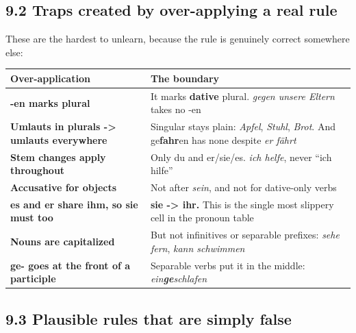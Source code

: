 \documentclass[
  11pt,
]{article}
\newcounter{none} %
\begin{document}
\subsection{9.2 Traps created by over-applying a real
rule}\label{traps-created-by-over-applying-a-real-rule}

These are the hardest to unlearn, because the rule is genuinely correct
somewhere else:

{\def\LTcaptype{none} %
\begin{longtable}[]{@{}
  >{\raggedright\arraybackslash}p{}
  >{\raggedright\arraybackslash}p{}@{}}
\toprule\noalign{}
\begin{minipage}[b]{\linewidth}\raggedright
Over-application
\end{minipage} & \begin{minipage}[b]{\linewidth}\raggedright
The boundary
\end{minipage} \\
\midrule\noalign{}
\endhead
\bottomrule\noalign{}
\endlastfoot
\textbf{-en marks plural} & It marks \textbf{dative} plural. \emph{gegen
unsere Eltern} takes no -en \\
\textbf{Umlauts in plurals -\textgreater{} umlauts everywhere} &
Singular stays plain: \emph{Apfel}, \emph{Stuhl}, \emph{Brot}. And
ge\textbf{fahr}en has none despite \emph{er fährt} \\
\textbf{Stem changes apply throughout} & Only du and er/sie/es.
\emph{ich helfe}, never ``ich hilfe'' \\
\textbf{Accusative for objects} & Not after \emph{sein}, and not for
dative-only verbs \\
\textbf{es and er share ihm, so sie must too} & \textbf{sie
-\textgreater{} ihr.} This is the single most slippery cell in the
pronoun table \\
\textbf{Nouns are capitalized} & But not infinitives or separable
prefixes: \emph{sehe fern}, \emph{kann schwimmen} \\
\textbf{ge- goes at the front of a participle} & Separable verbs put it
in the middle: \emph{ein\textbf{ge}schlafen} \\
\end{longtable}
}

\subsection{9.3 Plausible rules that are simply
false}\label{plausible-rules-that-are-simply-false}
\end{document}
